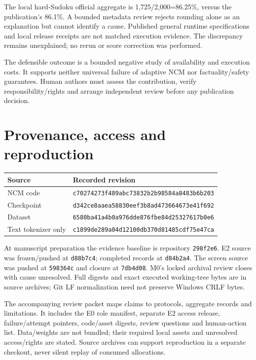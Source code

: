 \documentclass[11pt]{article}
\begin{document}
The local hard-Sudoku official aggregate is 1,725/2,000=86.25\%, versus the publication's 86.1\%. A bounded metadata review rejects rounding alone as an explanation but cannot identify a cause. Published general runtime specifications and local release receipts are not matched execution evidence. The discrepancy remains unexplained; no rerun or score correction was performed.

The defensible outcome is a bounded negative study of availability and execution costs. It supports neither universal failure of adaptive NCM nor factuality/safety guarantees. Human authors must assess the contribution, verify responsibility/rights and arrange independent review before any publication decision.

\appendix
\section{Provenance, access and reproduction}\label{app:repro}
\begin{center}\footnotesize
\begin{tabular}{lp{.64\linewidth}}
\toprule
Source & Recorded revision\\
\midrule
NCM code & \texttt{c70274273f489abc73832b2b98584a8483b6b203}\\
Checkpoint & \texttt{d342ce8aaea58830eef3b8ad473664673e41f692}\\
Dataset & \texttt{6580ba41a4b0a976dde876fbe84d25327617b0e6}\\
Text tokenizer only & \texttt{c1899de289a04d12100db370d81485cdf75e47ca}\\
\bottomrule
\end{tabular}
\end{center}
{\raggedright At manuscript preparation the evidence baseline is repository \texttt{298f2e6}. E2 source was frozen/pushed at \texttt{d88b7c4}; completed records at \texttt{d84b2a4}. The screen source was pushed at \texttt{598364c} and closure at \texttt{7db4d08}. M0's locked archival review closes with cause unresolved. Full digests and exact executed working-tree bytes are in source archives; Git LF normalization need not preserve Windows CRLF bytes.\par}

The accompanying review packet maps claims to protocols, aggregate records and limitations. It includes the E0 role manifest, separate E2 access release, failure/attempt pointers, code/asset digests, review questions and human-action list. Data/weights are not bundled; their required local assets and unresolved access/rights are stated. Source archives can support reproduction in a separate checkout, never silent replay of consumed allocations.
\end{document}
